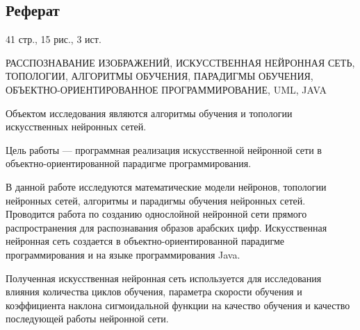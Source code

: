 \begin{center}
\section*{Реферат}
\end{center}

\vspace{2em}
41 стр., 15 рис., 3 ист.

\vspace{2em}
РАССПОЗНАВАНИЕ ИЗОБРАЖЕНИЙ, ИСКУССТВЕННАЯ НЕЙРОННАЯ СЕТЬ, ТОПОЛОГИИ, АЛГОРИТМЫ ОБУЧЕНИЯ, ПАРАДИГМЫ ОБУЧЕНИЯ, ОБЪЕКТНО-ОРИЕНТИРОВАННОЕ ПРОГРАММИРОВАНИЕ, UML, JAVA

\vspace{2em}
Объектом исследования являются алгоритмы обучения и топологии искусственных нейронных сетей.

Цель работы --- программная реализация искусственной нейронной сети в объектно-ориентированной парадигме программирования.

В данной работе исследуются математические модели нейронов, топологии нейронных сетей, алгоритмы и парадигмы обучения нейронных сетей.
Проводится работа по созданию однослойной нейронной сети прямого распространения для распознавания образов арабских цифр.
Искусственная нейронная сеть создается в объектно-ориентированной парадигме программирования и на языке программирования Java.

Полученная искусственная нейронная сеть используется для исследования влияния количества циклов обучения, параметра скорости обучения и коэффициента наклона сигмоидальной функции на качество обучения и качество последующей работы нейронной сети.